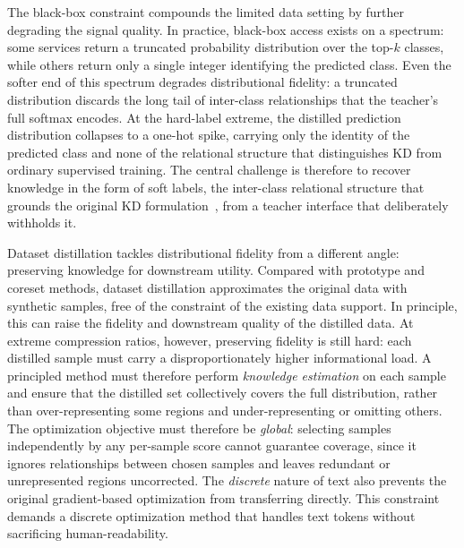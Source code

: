 \documentclass[12pt, a4paper, twoside]{book}
\numberwithin{equation}{chapter}
\theoremstyle{plain}
\theoremstyle{definition}
\theoremstyle{remark}
\newenvironment{foldable}{}{}
\begin{document}
\begin{foldable}
  The black-box constraint compounds the limited data setting by further degrading the signal quality.
  In practice, black-box access exists on a spectrum: some services return a truncated probability distribution over the top-$k$ classes, while others return only a single integer identifying the predicted class.
  Even the softer end of this spectrum degrades distributional fidelity: a truncated distribution discards the long tail of inter-class relationships that the teacher's full softmax encodes.
  At the hard-label extreme, the distilled prediction distribution collapses to a one-hot spike, carrying only the identity of the predicted class and none of the relational structure that distinguishes \ac{KD} from ordinary supervised training.
  The central challenge is therefore to recover knowledge in the form of soft labels, the inter-class relational structure that grounds the original \ac{KD} formulation~\cite{hinton2015distilling}, from a teacher interface that deliberately withholds it.
\end{foldable}

\begin{foldable}
  Dataset distillation tackles distributional fidelity from a different angle: preserving knowledge for downstream utility.
  Compared with prototype and coreset methods, dataset distillation approximates the original data with synthetic samples, free of the constraint of the existing data support.
  In principle, this can raise the fidelity and downstream quality of the distilled data.
  At extreme compression ratios, however, preserving fidelity is still hard: each distilled sample must carry a disproportionately higher informational load.
  A principled method must therefore perform \textit{knowledge estimation} on each sample and ensure that the distilled set collectively covers the full distribution, rather than over-representing some regions and under-representing or omitting others.
  The optimization objective must therefore be \textit{global}: selecting samples independently by any per-sample score cannot guarantee coverage, since it ignores relationships between chosen samples and leaves redundant or unrepresented regions uncorrected.
  The \textit{discrete} nature of text also prevents the original gradient-based optimization from transferring directly.
  This constraint demands a discrete optimization method that handles text tokens without sacrificing human-readability.
\end{foldable}
\end{document}
